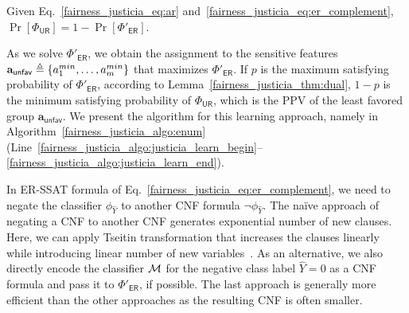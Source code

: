 \begin{lemma}\label{fairness_justicia_thm:dual}
Given Eq.~\eqref{fairness_justicia_eq:ar} and~\eqref{fairness_justicia_eq:er_complement},	$ \Pr[\Phi_{\mathsf{UR}}] = 1 - \Pr[\Phi'_{\mathsf{ER}}]  $.
\end{lemma}
As we solve $\Phi'_{\mathsf{ER}}$, we obtain the assignment to the sensitive features $\mathbf{a}_{\mathsf{unfav}} \triangleq \{a^{min}_1, \dots, a^{min}_{m}\}$ that maximizes $\Phi'_{\mathsf{ER}}$. 
If $ p $ is the maximum satisfying probability of $ \Phi'_{\mathsf{ER}} $, according to Lemma~\ref{fairness_justicia_thm:dual}, $ 1 - p $ is the minimum satisfying probability of $ \Phi_{\mathsf{UR}} $,  which is the PPV of the least favored group $ \mathbf{a}_{\mathsf{unfav}}$. We present the algorithm for this learning approach, namely {\justicialearn} in Algorithm~\ref{fairness_justicia_algo:enum} (Line~\ref{fairness_justicia_algo:justicia_learn_begin}--\ref{fairness_justicia_algo:justicia_learn_end}).

\iffalse
\begin{algorithm}[t!]
	\caption{\justicialearn: Learning ER-SSAT Encoding}
	\label{fairness_justicia_algo:learn}
	\begin{algorithmic}[1]
		\Function{{\justicialearn}}{$ X,A,\hat{Y} $}
		\State $ \phi_{\hat{Y}} = \mathsf{CNF}(\hat{Y}  = 1) $
		\State $ p_{i} = \mathsf{CalculateProb}(x_i), \forall x_i \in X $
		\State $  \Phi_\mathbf{ER} = \exists a_1,\dots, \exists a_{\numsensitive}, \R^{p_{1}}x_1, \dots, \R^{p_{\numnonsensitive}}x_{\numnonsensitive}. \; \phi_{\hat{Y}} $
		\State $  \Phi'_\mathbf{ER} = \exists a_1,\dots, \exists a_{\numsensitive}, \R^{p_{1}}x_1, \dots, \R^{p_{\numnonsensitive}}x_{\numnonsensitive}. \; \neg \phi_{\hat{Y}} $
		\State \Return $ \mathsf{SSAT}(\Phi_\mathbf{ER}), 1 - \mathsf{SSAT}(\Phi'_\mathbf{ER}) $
		\EndFunction
	\end{algorithmic}
\end{algorithm}
\fi

In ER-SSAT formula of Eq.~\eqref{fairness_justicia_eq:er_complement}, we need to negate the classifier $ \phi_{\hat{Y}} $ to another CNF formula $ \neg \phi_{\hat{Y}} $. The na\"ive approach of negating a CNF to another CNF generates exponential number of new clauses. Here, we can apply Tseitin transformation that increases the clauses linearly while introducing linear number of new variables~\cite{tseitin1983complexity}. As an alternative, we also directly encode the classifier $\mathcal{M}$ for the negative class label $\hat{Y} = 0$ as a CNF formula and pass it to $\Phi'_{\mathsf{ER}} $, if possible. The last approach is generally more efficient than the other approaches as the resulting CNF is often smaller. 



